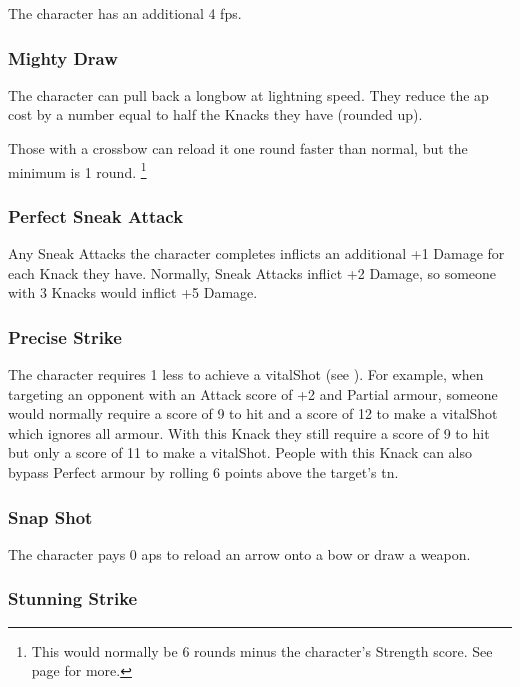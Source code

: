 \begin{multicols}{2}
The character has an additional 4 \glspl{fp}.

\subsubsection{Mighty Draw}

The character can pull back a longbow at lightning speed.
They reduce the \gls{ap} cost by a number equal to half the Knacks they have (rounded up).

Those with a crossbow can reload it one round faster than normal, but the minimum is 1 round.%
\footnote{This would normally be 6 rounds minus the character's Strength score. See page \pageref{crossbow} for more.}

\subsubsection{Perfect Sneak Attack}

Any Sneak Attacks the character completes inflicts an additional +1 Damage for each Knack they have.
Normally, Sneak Attacks inflict +2 Damage, so someone with 3 Knacks would inflict +5 Damage.

\subsubsection{Precise Strike}\label{precisestrike}

The character requires 1 less to achieve a \gls{vitalShot} (see ).
For example, when targeting an opponent with an Attack score of +2 and Partial armour, someone would normally require a score of 9 to hit and a score of 12 to make a \gls{vitalShot} which ignores all armour.
With this Knack they still require a score of 9 to hit but only a score of 11 to make a \gls{vitalShot}.
People with this Knack can also bypass Perfect armour by rolling 6 points above the target's \gls{tn}.

\subsubsection{Snap Shot}

The character pays 0 \glspl{ap} to reload an arrow onto a bow or draw a weapon.

\subsubsection{Stunning Strike}\label{stunningstrike}


\end{multicols}
